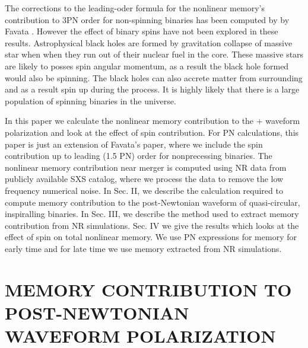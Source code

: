 \documentclass[twocolumn,showpacs,aps,prd,nobibnotes,floatfix]{revtex4-1}
\begin{document}
\par The corrections to the leading-oder formula for the nonlinear memory's contribution to 3PN order for non-spinning binaries has been computed by by Favata \cite{Favata2009}. However the effect of binary spins have not been explored in these results. Astrophysical black holes are formed by gravitation collapse of massive star when when they run out of their nuclear fuel in the core. These massive stars are likely to posses spin angular momentum, as a result the black hole formed would also be spinning. The black holes can also accrete matter from surrounding and as a result spin up during the process. It is highly likely that there is a large population of spinning binaries in the universe.      
\par In this paper we calculate the nonlinear memory contribution to the + waveform polarization and look at the effect of spin contribution. For PN calculations, this paper is just an extension of Favata's\cite{Favata2009} paper, where we include the spin contribution up to leading (1.5 PN) order for nonprecessing binaries. The nonlinear memory contribution near merger is computed using NR data from publicly available SXS catalog, where we process the data to remove the low frequency numerical noise. In Sec. II, we describe the calculation required to compute memory contribution to the post-Newtonian waveform of quasi-circular, inspiralling binaries. In Sec. III, we describe the method used to extract memory contribution from NR simulations. Sec. IV we give the results which looks at the effect of spin on total nonlinear memory. We use PN expressions for memory for early time and for late time we use memory extracted from NR simulations.


\section{MEMORY CONTRIBUTION TO POST-NEWTONIAN WAVEFORM POLARIZATION}
\end{document}
